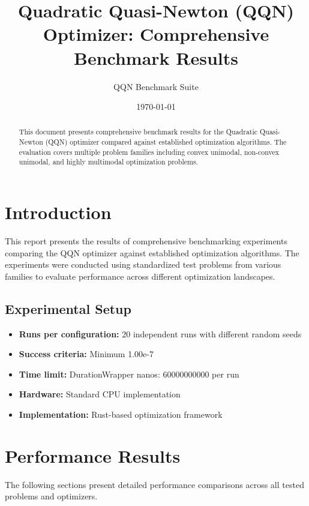 \documentclass[11pt]{article}
\title{Quadratic Quasi-Newton (QQN) Optimizer: Comprehensive Benchmark Results}
\author{QQN Benchmark Suite}
\date{\today}
\begin{document}
\maketitle
\begin{abstract}
This document presents comprehensive benchmark results for the Quadratic Quasi-Newton (QQN) optimizer compared against established optimization algorithms. The evaluation covers multiple problem families including convex unimodal, non-convex unimodal, and highly multimodal optimization problems.
\end{abstract}
\section{Introduction}
This report presents the results of comprehensive benchmarking experiments comparing the QQN optimizer against established optimization algorithms. The experiments were conducted using standardized test problems from various families to evaluate performance across different optimization landscapes.
\subsection{Experimental Setup}
\begin{itemize}
\item \textbf{Runs per configuration:} 20 independent runs with different random seeds
\item \textbf{Success criteria:} Minimum 1.00e-7\\%
\item \textbf{Time limit:} DurationWrapper { nanos: 60000000000 } per run
\item \textbf{Hardware:} Standard CPU implementation
\item \textbf{Implementation:} Rust-based optimization framework
\end{itemize}
\section{Performance Results}
The following sections present detailed performance comparisons across all tested problems and optimizers.
\end{document}

